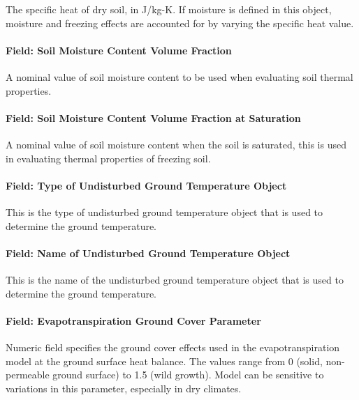 The specific heat of dry soil, in J/kg-K. If moisture is defined in this object, moisture and freezing effects are accounted for by varying the specific heat value.

\paragraph{Field: Soil Moisture Content Volume Fraction}\label{field-soil-moisture-content-volume-fraction-2}

A nominal value of soil moisture content to be used when evaluating soil thermal properties.

\paragraph{Field: Soil Moisture Content Volume Fraction at Saturation}\label{field-soil-moisture-content-volume-fraction-at-saturation-2}

A nominal value of soil moisture content when the soil is saturated, this is used in evaluating thermal properties of freezing soil.

\paragraph{Field: Type of Undisturbed Ground Temperature Object}\label{field-type-of-undisturbed-ground-temperature-object-1-000}

This is the type of undisturbed ground temperature object that is used to determine the ground temperature.

\paragraph{Field: Name of Undisturbed Ground Temperature Object}\label{field-name-of-undisturbed-ground-temperature-object-1-000}

This is the name of the undisturbed ground temperature object that is used to determine the ground temperature.

\paragraph{Field: Evapotranspiration Ground Cover Parameter}\label{field-evapotranspiration-ground-cover-parameter-2}

Numeric field specifies the ground cover effects used in the evapotranspiration model at the ground surface heat balance. The values range from 0 (solid, non-permeable ground surface) to 1.5 (wild growth). Model can be sensitive to variations in this parameter, especially in dry climates.

